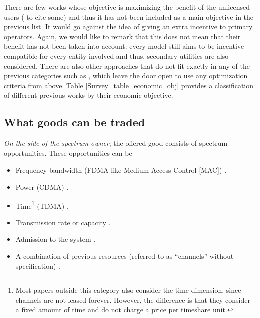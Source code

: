 There are few works whose objective is maximizing the benefit of the unlicensed users (\cite{ref:Niyato2007_Game,ref:Illeri2005,ref:Niyato2009_Dyn} to cite some) and thus it has not been included as a main objective in the previous list. It would go against the idea of giving an extra incentive to primary operators. Again, we would like to remark that this does not mean that their benefit has not been taken into account: every model still aims to be incentive-compatible for every entity involved and thus, secondary utilities are also considered. There are also other approaches that do not fit exactly in any of the previous categories such as \cite{ref:Illeri2005,ref:Zhou2008}, which leave the door open to use any optimization criteria from above. Table \ref{Survey_table_economic_obj} provides a classification of different previous works by their economic objective.



\subsection{What goods can be traded}
\label{subsec:What}
\textit{On the side of the spectrum owner}, the offered good consists of spectrum opportunities. These opportunities can be
\begin{itemize}
\item Frequency bandwidth (FDMA-like Medium Access Control [MAC]) \cite{ref:Niyato2007_Game,ref:Niyato2008_Comp,ref:Duan2010_Cog,ref:Duan2010_Comp,ref:Zhu2012_Dyn,ref:Xu2010,ref:Sengupta2007,ref:Sengupta2009,ref:Niyato2008_Mark,ref:Niyato2010,ref:Wang2010_Spec}. 
\item Power (CDMA) \cite{ref:Wang2008,ref:Yu2010,ref:Gao2011,ref:Huang2006,ref:Jayaweera2009,ref:Jayaweera2010,ref:Vazquez2010}.
\item Time\footnote{Most papers outside this category also consider the time dimension, since channels are not leased forever. However, the difference is that they consider a fixed amount of time and do not charge a price per timeshare unit.} (TDMA)  \cite{ref:Xu2011,ref:Simeone2008,ref:Zhang2009,ref:Li2011,ref:Duan2011_Contract,ref:Niyato2007_Eq}.
\item Transmission rate or capacity \cite{ref:Illeri2005,ref:Jia2008_com,ref:Maille2009} .
\item Admission to the system \cite{ref:Kaskebar2012,ref:Mutlu2008,ref:Yang2011}.
\item A combination of previous resources (referred to as ``channels'' without specification) \cite{ref:Xu2012,ref:Zhou2008,ref:Zhu2012,ref:Xing2007,ref:Jia2009_Rev,ref:Niyato2009_Dyn,ref:Niyato2007_Hier,ref:Gao2011_MAP,ref:Zhou2009_TRUST}. 
\end{itemize}

